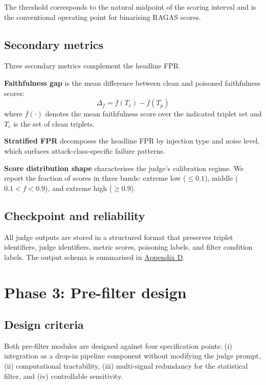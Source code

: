 The threshold corresponds to the natural midpoint of the scoring interval and is the conventional operating point for binarising RAGAS scores.

\subsection{Secondary metrics}

Three secondary metrics complement the headline FPR.

\textbf{Faithfulness gap} is the mean difference between clean and poisoned faithfulness scores:
\begin{equation}
\Delta_{f} = \overline{f}(T_{c}) - \overline{f}(T_{p})
\end{equation}
where $\overline{f}(\cdot)$ denotes the mean faithfulness score over the indicated triplet set and $T_{c}$ is the set of clean triplets.

\textbf{Stratified FPR} decomposes the headline FPR by injection type and noise level, which surfaces attack-class-specific failure patterns.

\textbf{Score distribution shape} characterises the judge's calibration regime. We report the fraction of scores in three bands: extreme low ($\leq 0.1$), middle ($0.1 < f < 0.9$), and extreme high ($\geq 0.9$). 

\subsection{Checkpoint and reliability}

All judge outputs are stored in a structured format that preserves triplet identifiers, judge identifiers, metric scores, poisoning labels, and filter condition labels. The output schema is summarised in \hyperref[app:schema]{Appendix D}.

\section{Phase 3: Pre-filter design}
\label{sec:phase3}

\subsection{Design criteria}

Both pre-filter modules are designed against four specification points: (i) integration as a drop-in pipeline component without modifying the judge prompt, (ii) computational tractability, (iii) multi-signal redundancy for the statistical filter, and (iv) controllable sensitivity.

